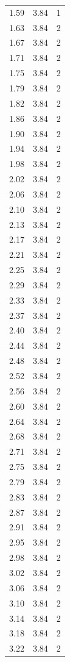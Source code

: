 \begin{longtable}{lrr}
  1.59 & 3.84 & 1 \\
  1.63 & 3.84 & 2 \\
  1.67 & 3.84 & 2 \\
  1.71 & 3.84 & 2 \\
  1.75 & 3.84 & 2 \\
  1.79 & 3.84 & 2 \\
  1.82 & 3.84 & 2 \\
  1.86 & 3.84 & 2 \\
  1.90 & 3.84 & 2 \\
  1.94 & 3.84 & 2 \\
  1.98 & 3.84 & 2 \\
  2.02 & 3.84 & 2 \\
  2.06 & 3.84 & 2 \\
  2.10 & 3.84 & 2 \\
  2.13 & 3.84 & 2 \\
  2.17 & 3.84 & 2 \\
  2.21 & 3.84 & 2 \\
  2.25 & 3.84 & 2 \\
  2.29 & 3.84 & 2 \\
  2.33 & 3.84 & 2 \\
  2.37 & 3.84 & 2 \\
  2.40 & 3.84 & 2 \\
  2.44 & 3.84 & 2 \\
  2.48 & 3.84 & 2 \\
  2.52 & 3.84 & 2 \\
  2.56 & 3.84 & 2 \\
  2.60 & 3.84 & 2 \\
  2.64 & 3.84 & 2 \\
  2.68 & 3.84 & 2 \\
  2.71 & 3.84 & 2 \\
  2.75 & 3.84 & 2 \\
  2.79 & 3.84 & 2 \\
  2.83 & 3.84 & 2 \\
  2.87 & 3.84 & 2 \\
  2.91 & 3.84 & 2 \\
  2.95 & 3.84 & 2 \\
  2.98 & 3.84 & 2 \\
  3.02 & 3.84 & 2 \\
  3.06 & 3.84 & 2 \\
  3.10 & 3.84 & 2 \\
  3.14 & 3.84 & 2 \\
  3.18 & 3.84 & 2 \\
  3.22 & 3.84 & 2 \\

\end{longtable}
